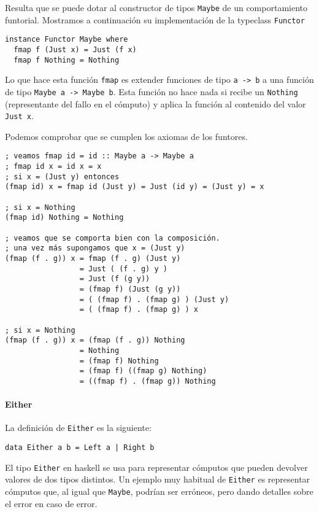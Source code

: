 Resulta que se puede dotar al constructor de tipos \verb~Maybe~ de
un comportamiento funtorial. Mostramos a continuación su
implementación de la typeclass \verb~Functor~

\begin{verbatim}
instance Functor Maybe where
  fmap f (Just x) = Just (f x)
  fmap f Nothing = Nothing
\end{verbatim}

Lo que hace esta función \verb~fmap~ es extender funciones de tipo
\verb~a -> b~ a una función de tipo \verb~Maybe a -> Maybe b~. Esta función
no hace nada si recibe un \verb~Nothing~ (representante del fallo
en el cómputo) y aplica la función al contenido del valor \verb~Just x~.

Podemos comprobar que se cumplen los axiomas de los funtores.

\begin{verbatim}
; veamos fmap id = id :: Maybe a -> Maybe a
; fmap id x = id x = x
; si x = (Just y) entonces
(fmap id) x = fmap id (Just y) = Just (id y) = (Just y) = x

; si x = Nothing
(fmap id) Nothing = Nothing

; veamos que se comporta bien con la composición.
; una vez más supongamos que x = (Just y)
(fmap (f . g)) x = fmap (f . g) (Just y)
                 = Just ( (f . g) y )
                 = Just (f (g y))
                 = (fmap f) (Just (g y))
                 = ( (fmap f) . (fmap g) ) (Just y)
                 = ( (fmap f) . (fmap g) ) x

; si x = Nothing
(fmap (f . g)) x = (fmap (f . g)) Nothing
                 = Nothing
                 = (fmap f) Nothing
                 = (fmap f) ((fmap g) Nothing)
                 = ((fmap f) . (fmap g)) Nothing
\end{verbatim}

\paragraph{Either}
La definición de \verb~Either~ es la siguiente:

\begin{verbatim}
data Either a b = Left a | Right b
\end{verbatim}

El tipo \verb~Either~ en haskell se usa para representar cómputos que pueden
devolver valores de dos tipos distintos. Un ejemplo muy habitual
de \verb~Either~ es representar cómputos que, al igual que \verb~Maybe~,
podrían ser erróneos, pero dando detalles sobre el error en caso
de error.

